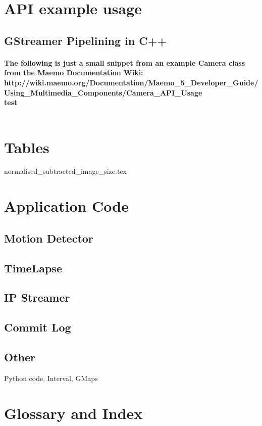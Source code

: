 \documentclass[11pt]{article} %
\begin{document}
\section{API example usage}
\subsection{GStreamer Pipelining in C++}
\paragraph{ The following is just a small snippet from an example Camera class from the Maemo Documentation Wiki:\\http://wiki.maemo.org/Documentation/Maemo\_5\_Developer\_Guide/Using\_Multimedia\_Components/Camera\_API\_Usage
\\ test\\\\}


\section{Tables}
{normalised_subtracted_image_size.tex}


\section{Application Code}
\subsection{Motion Detector}
\subsection{TimeLapse}
\subsection{IP Streamer}
\subsection{Commit Log}
\subsection{Other}{Python code, Interval, GMaps}

\section{Glossary and Index}
\end{document}
